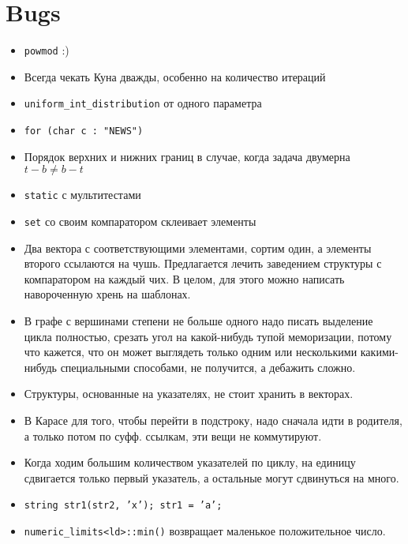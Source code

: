 \section{Bugs}

\begin{itemize}
	\item \texttt{powmod} :)

	\item Всегда чекать Куна дважды, особенно на количество итераций

	\item \texttt{uniform_int_distribution} от одного параметра

	\item \texttt{for (char c : "NEWS")}

	\item Порядок верхних и нижних границ в случае, когда задача двумерна
		$t - b \neq b - t$

	\item \texttt{static} с мультитестами

	\item \texttt{set} со своим компаратором склеивает элементы

	\item Два вектора с соответствующими элементами, сортим один, а элементы
		второго ссылаются на чушь. Предлагается лечить заведением структуры с
		компаратором на каждый чих. В целом, для этого можно написать навороченную
		хрень на шаблонах.

	\item В графе с вершинами степени не больше одного надо писать выделение
		цикла полностью, срезать угол на какой-нибудь тупой меморизации, потому
		что кажется, что он может выглядеть только одним или несколькими
		какими-нибудь специальными способами, не получится, а дебажить сложно.

	\item Структуры, основанные на указателях, не стоит хранить в векторах.

	\item В Карасе для того, чтобы перейти в подстроку, надо сначала идти в
		родителя, а только потом по суфф. ссылкам, эти вещи не коммутируют.

	\item Когда ходим большим количеством указателей по циклу, на единицу
		сдвигается только первый указатель, а остальные могут сдвинуться на много.

	\item \texttt{string str1(str2, 'x'); str1 = 'a';}

	\item \texttt{numeric_limits<ld>::min()} возвращает маленькое положительное число.
\end{itemize}
